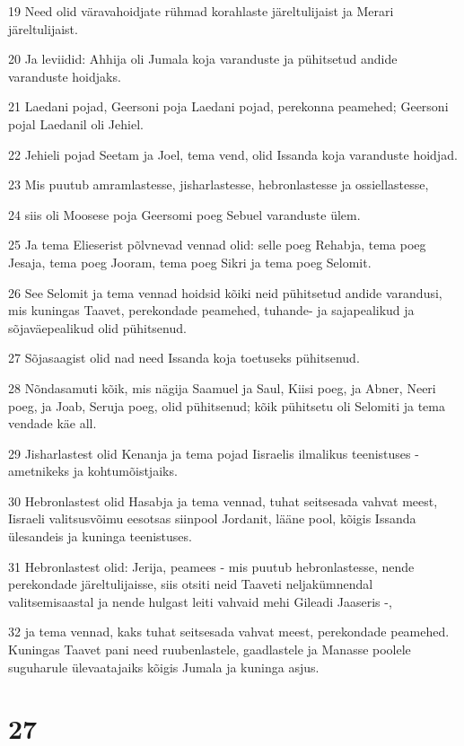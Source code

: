 \par 19 Need olid väravahoidjate rühmad korahlaste järeltulijaist ja Merari järeltulijaist.
\par 20 Ja leviidid: Ahhija oli Jumala koja varanduste ja pühitsetud andide varanduste hoidjaks.
\par 21 Laedani pojad, Geersoni poja Laedani pojad, perekonna peamehed; Geersoni pojal Laedanil oli Jehiel.
\par 22 Jehieli pojad Seetam ja Joel, tema vend, olid Issanda koja varanduste hoidjad.
\par 23 Mis puutub amramlastesse, jisharlastesse, hebronlastesse ja ossiellastesse,
\par 24 siis oli Moosese poja Geersomi poeg Sebuel varanduste ülem.
\par 25 Ja tema Elieserist põlvnevad vennad olid: selle poeg Rehabja, tema poeg Jesaja, tema poeg Jooram, tema poeg Sikri ja tema poeg Selomit.
\par 26 See Selomit ja tema vennad hoidsid kõiki neid pühitsetud andide varandusi, mis kuningas Taavet, perekondade peamehed, tuhande- ja sajapealikud ja sõjaväepealikud olid pühitsenud.
\par 27 Sõjasaagist olid nad need Issanda koja toetuseks pühitsenud.
\par 28 Nõndasamuti kõik, mis nägija Saamuel ja Saul, Kiisi poeg, ja Abner, Neeri poeg, ja Joab, Seruja poeg, olid pühitsenud; kõik pühitsetu oli Selomiti ja tema vendade käe all.
\par 29 Jisharlastest olid Kenanja ja tema pojad Iisraelis ilmalikus teenistuses - ametnikeks ja kohtumõistjaiks.
\par 30 Hebronlastest olid Hasabja ja tema vennad, tuhat seitsesada vahvat meest, Iisraeli valitsusvõimu eesotsas siinpool Jordanit, lääne pool, kõigis Issanda ülesandeis ja kuninga teenistuses.
\par 31 Hebronlastest olid: Jerija, peamees - mis puutub hebronlastesse, nende perekondade järeltulijaisse, siis otsiti neid Taaveti neljakümnendal valitsemisaastal ja nende hulgast leiti vahvaid mehi Gileadi Jaaseris -,
\par 32 ja tema vennad, kaks tuhat seitsesada vahvat meest, perekondade peamehed. Kuningas Taavet pani need ruubenlastele, gaadlastele ja Manasse poolele suguharule ülevaatajaiks kõigis Jumala ja kuninga asjus.

\chapter{27}

